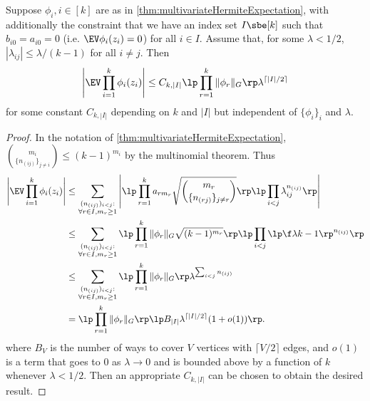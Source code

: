 \documentclass[main.tex]{subfiles}
\begin{document}
\begin{lemma}\label{lemma:smallRhoMomentBound}
Suppose $\phi_i, i\in[k]$ are as in \cref{thm:multivariateHermiteExpectation}, with additionally the constraint that we have an index set $I \sbe [k]$ such that $b_{i0} = a_{i0} = 0$ (i.e. $\EV \phi_i(z_i) = 0$) for all $i \in I$.
Assume that, for some $\lambda < 1/2 $, $|\lambda_{ij}| \le \lambda/(k-1)$ for all $i \ne j$.
Then
\begin{align*}
    \left|\EV \prod_{i=1}^k \phi_i(z_i)\right| \le
    C_{k,|I|} \lp \prod_{r=1}^k \|\phi_r\|_G\rp 
        \lambda^{\lceil |I|/2\rceil}
\end{align*}
for some constant $C_{k, |I|}$ depending on $k$ and $|I|$ but independent of $\{\phi_i\}_i$ and $\lambda$.
\end{lemma}
\begin{proof}
In the notation of \cref{thm:multivariateHermiteExpectation}, $\binom{m_i}{\{n_{(ij)}\}_{j \ne i}} \le (k-1)^{m_i}$ by the multinomial theorem.
Thus
\begin{align*}
    \left|\EV \prod_{i=1}^k \phi_i(z_i)\right|
    &\le
        \sum_{\substack{(n_{(ij)})_{i<j}:\\\forall r\in I, m_r \ge 1}}
        \left|
        \lp \prod_{r=1}^k a_{r m_r} \sqrt{\binom{m_r}{\{n_{(rj)}\}_{j \ne r}}} \rp 
        \lp \prod_{i<j} \lambda_{ij}^{n_{(ij)}}
            \rp
        \right|
        \\
    &\le
        \sum_{\substack{(n_{(ij)})_{i<j}:\\\forall r \in I, m_r \ge 1}}
        \lp \prod_{r=1}^k \|\phi_r\|_G \sqrt{(k-1)^{m_r}} \rp 
        \lp \prod_{i<j} \lp \f \lambda{k-1} \rp^{n_{(ij)}}
            \rp
        \\
    &\le
        \sum_{\substack{(n_{(ij)})_{i<j}:\\\forall r \in I, m_r \ge 1}}
        \lp \prod_{r=1}^k \|\phi_r\|_G  \rp 
        \lambda^{\sum_{i<j} n_{(ij)}}
        \\
    &=
        \lp \prod_{r=1}^k \|\phi_r\|_G\rp 
        \lp B_{|I|} \lambda^{\lceil |I|/2\rceil} (1 + o(1)) \rp
        .
\end{align*}
where $B_V$ is the number of ways to cover $V$ vertices with $\lceil V/2 \rceil$ edges, and
$o(1)$ is a term that goes to 0 as $\lambda \to 0$ and is bounded above by a function of $k$ whenever $\lambda < 1/2$.
Then an appropriate $C_{k, |I|}$ can be chosen to obtain the desired result.
\end{proof}
\end{document}
